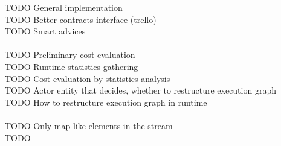 TODO General implementation \\
TODO Better contracts interface (trello) \\
TODO Smart advices \\
 \\
TODO Preliminary cost evaluation \\
TODO Runtime statistics gathering \\
TODO Cost evaluation by statistics analysis \\
TODO Actor entity that decides, whether to restructure execution graph \\
TODO How to restructure execution graph in runtime \\
 \\
TODO Only map-like elements in the stream \\
TODO
